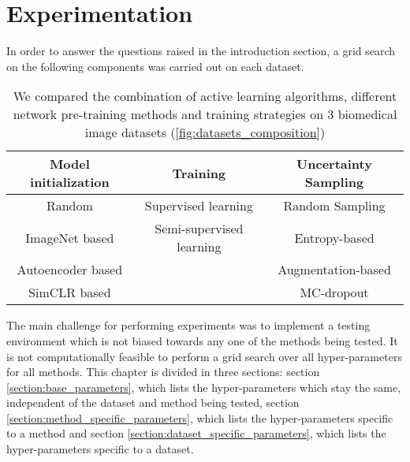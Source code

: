 
\chapter{Experimentation}\label{chapter:experiments}
In order to answer the questions raised in the introduction section, a grid search on the following components was carried out on each dataset.

\begin{table}[htbp]
\captionsetup{format=plain}
\centering
 \begin{tabular}{c c c} 
 \hline
 Model initialization & Training & Uncertainty Sampling \\ [0.5ex] 
 \hline
 Random & Supervised learning & Random Sampling \\ 
 ImageNet based\cite{deng2009} & Semi-supervised learning & Entropy-based \\
 Autoencoder based &  & Augmentation-based \\
 SimCLR based &  & MC-dropout \\
 \hline
\end{tabular}
\caption{We compared the combination of active learning algorithms, different network pre-training methods and training strategies on 3 biomedical image datasets (\ref{fig:datasets_composition})}
\label{table:experimental_grid}
\end{table}

The main challenge for performing experiments was to implement a testing environment which is not biased towards any one of the methods being tested. It is not computationally feasible to perform a grid search over all hyper-parameters for all methods. This chapter is divided in three sections: section \ref{section:base_parameters}, which lists the hyper-parameters which stay the same, independent of the dataset and method being tested, section \ref{section:method_specific_parameters}, which lists the hyper-parameters specific to a method and section \ref{section:dataset_specific_parameters}, which lists the hyper-parameters specific to a dataset.

